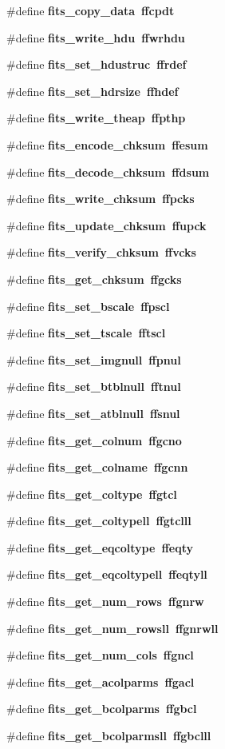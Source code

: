 \begin{CompactItemize}
\item 
\#define \bf{fits\_\-copy\_\-data}~ffcpdt
\item 
\#define \bf{fits\_\-write\_\-hdu}~ffwrhdu
\item 
\#define \bf{fits\_\-set\_\-hdustruc}~ffrdef
\item 
\#define \bf{fits\_\-set\_\-hdrsize}~ffhdef
\item 
\#define \bf{fits\_\-write\_\-theap}~ffpthp
\item 
\#define \bf{fits\_\-encode\_\-chksum}~ffesum
\item 
\#define \bf{fits\_\-decode\_\-chksum}~ffdsum
\item 
\#define \bf{fits\_\-write\_\-chksum}~ffpcks
\item 
\#define \bf{fits\_\-update\_\-chksum}~ffupck
\item 
\#define \bf{fits\_\-verify\_\-chksum}~ffvcks
\item 
\#define \bf{fits\_\-get\_\-chksum}~ffgcks
\item 
\#define \bf{fits\_\-set\_\-bscale}~ffpscl
\item 
\#define \bf{fits\_\-set\_\-tscale}~fftscl
\item 
\#define \bf{fits\_\-set\_\-imgnull}~ffpnul
\item 
\#define \bf{fits\_\-set\_\-btblnull}~fftnul
\item 
\#define \bf{fits\_\-set\_\-atblnull}~ffsnul
\item 
\#define \bf{fits\_\-get\_\-colnum}~ffgcno
\item 
\#define \bf{fits\_\-get\_\-colname}~ffgcnn
\item 
\#define \bf{fits\_\-get\_\-coltype}~ffgtcl
\item 
\#define \bf{fits\_\-get\_\-coltypell}~ffgtclll
\item 
\#define \bf{fits\_\-get\_\-eqcoltype}~ffeqty
\item 
\#define \bf{fits\_\-get\_\-eqcoltypell}~ffeqtyll
\item 
\#define \bf{fits\_\-get\_\-num\_\-rows}~ffgnrw
\item 
\#define \bf{fits\_\-get\_\-num\_\-rowsll}~ffgnrwll
\item 
\#define \bf{fits\_\-get\_\-num\_\-cols}~ffgncl
\item 
\#define \bf{fits\_\-get\_\-acolparms}~ffgacl
\item 
\#define \bf{fits\_\-get\_\-bcolparms}~ffgbcl
\item 
\#define \bf{fits\_\-get\_\-bcolparmsll}~ffgbclll
\item 

\end{CompactItemize}
